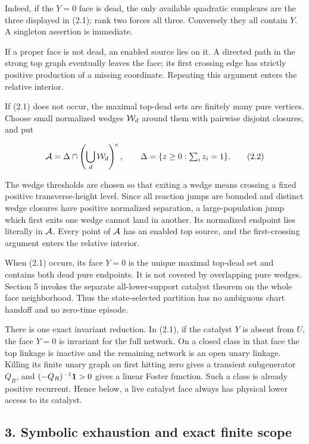 Indeed, if the \(Y=0\) face is dead, the only available quadratic
complexes are the three displayed in (2.1); rank two forces all three.
Conversely they all contain \(Y\). A singleton assertion is immediate.

If a proper face is not dead, an enabled source lies on it. A directed
path in the strong top graph eventually leaves the face; its first
crossing edge has strictly positive production of a missing coordinate.
Repeating this argument enters the relative interior.

If (2.1) does not occur, the maximal top-dead sets are finitely many
pure vertices. Choose small normalized wedges \({\cal W}_d\) around them
with pairwise disjoint closures, and put

\[
 {\cal A}=\Delta\cap
      \left(\bigcup_d{\cal W}_d\right)^{\mathrm c},
 \qquad \Delta=\{z\ge0:\textstyle\sum_i z_i=1\}.      \tag{2.2}
\]

The wedge thresholds are chosen so that exiting a wedge means crossing a
fixed positive transverse-height level. Since all reaction jumps are
bounded and distinct wedge closures have positive normalized separation,
a large-population jump which first exits one wedge cannot land in
another. Its normalized endpoint lies literally in \({\cal A}\). Every
point of \({\cal A}\) has an enabled top source, and the first-crossing
argument enters the relative interior.

When (2.1) occurs, its face \(Y=0\) is the unique maximal top-dead set
and contains both dead pure endpoints. It is not covered by overlapping
pure wedges. Section 5 invokes the separate all-lower-support catalyst
theorem on the whole face neighborhood. Thus the state-selected
partition has no ambiguous chart handoff and no zero-time episode.

There is one exact invariant reduction. In (2.1), if the catalyst \(Y\)
is absent from \(U\), the face \(Y=0\) is invariant for the full
network. On a closed class in that face the top linkage is inactive and
the remaining network is an open unary linkage. Killing its finite unary
graph on first hitting zero gives a transient subgenerator \(Q_R\), and
\((-Q_R)^{-1}{\bf1}>0\) gives a linear Foster function. Such a class is
already positive recurrent. Hence below, a live catalyst face always has
physical lower access to its catalyst.

\subsection{3. Symbolic exhaustion and exact finite
scope}


